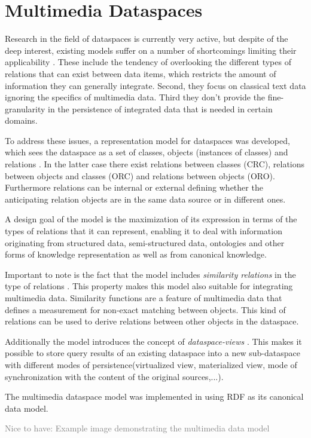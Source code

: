 \section{Multimedia Dataspaces}


Research in the field of dataspaces is currently very active, but despite of the deep interest, existing models suffer on a number of shortcomings limiting their applicability \cite[p. 1]{6167826}.
These include the tendency of overlooking the different types of relations that can exist between data items, which restricts the amount of information they can generally integrate.
Second, they focus on classical text data ignoring the specifics of multimedia data. Third they don't provide the fine-granularity in the persistence of integrated data that is needed in certain domains.

To address these issues, a representation model for dataspaces was developed, which sees the dataspace as a set of classes, objects (instances of classes) and relations \cite[p. 1]{6167826}.
In the latter case there exist relations between classes (CRC), relations between objects and classes (ORC) and relations between objects (ORO).
Furthermore relations can be internal or external defining whether the anticipating relation objects are in the same data source or in different ones.

A design goal of the model is the maximization of its expression in terms of the types of relations that it can represent, enabling it to deal with information originating from structured data, semi-structured data, ontologies and other forms of knowledge representation as well as from canonical  
knowledge.

Important to note is the fact that the model includes \emph{similarity relations} in the type of relations \cite[p. 3-4]{6167826}. This property makes this model also suitable for integrating multimedia data.
Similarity functions are a feature of multimedia data that defines a measurement for non-exact matching between objects.
This kind of relations can be used to derive relations between other objects in the dataspace.

Additionally the model introduces the concept of \emph{dataspace-views} \cite[p. 3]{6167826}. 
This makes it possible to store query results of an existing dataspace into a new sub-dataspace with different modes of persistence(virtualized view, materialized view, mode of synchronization with the content of the original sources,...).

The multimedia dataspace model was implemented in \cite[p. 30]{ZerrikBachelorThesis} using RDF as its canonical data model.


\textcolor{gray}{Nice to have: Example image demonstrating the multimedia data model}